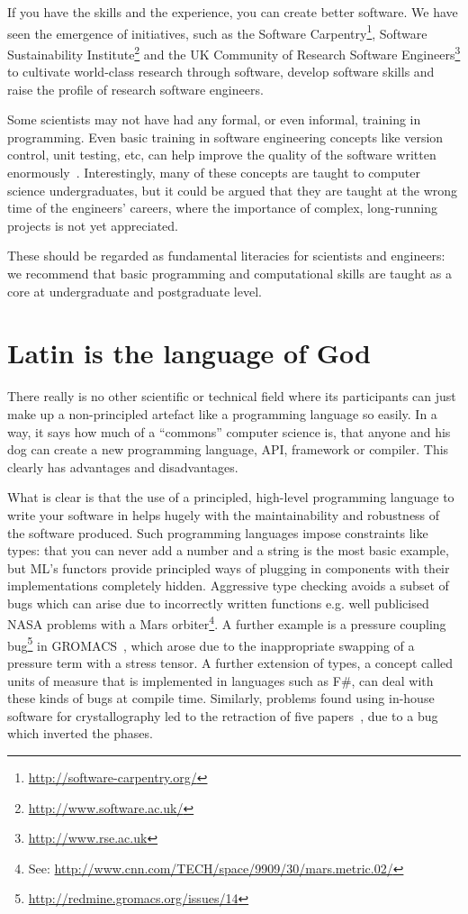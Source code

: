 \documentclass[10pt,conference,final]{IEEEtran}
\begin{document}
If you have the skills and the experience, you can create better
software. We have seen the emergence of initiatives, such as the Software
Carpentry\footnote{\url{http://software-carpentry.org/}}, Software
Sustainability Institute\footnote{\url{http://www.software.ac.uk/}}
and the UK Community of Research Software
Engineers\footnote{\url{http://www.rse.ac.uk}} to cultivate
world-class research through software, develop software skills and
raise the profile of research software engineers.

Some scientists may not have had any formal, or even informal,
training in programming. Even basic training in software engineering
concepts like version control, unit testing, etc, can help improve the
quality of the software written enormously~\cite{wilson2006}.
Interestingly, many of these concepts are taught to computer science
undergraduates, but it could be argued that they are taught at the
wrong time of the engineers' careers, where the importance of complex,
long-running projects is not yet appreciated.

These should be regarded as fundamental literacies for scientists and
engineers: we recommend that basic programming and computational
skills are taught as a core at undergraduate and postgraduate level.


\section{Latin is the language of God} 

There really is no other scientific or technical field where its
participants can just make up a non-principled artefact like a
programming language so easily. In a way, it says how much of a
``commons'' computer science is, that anyone and his dog can create a
new programming language, API, framework or compiler. This clearly has
advantages and disadvantages.

What is clear is that the use of a principled, high-level programming
language to write your software in helps hugely with the
maintainability and robustness of the software produced. Such
programming languages impose constraints like types: that you can
never add a number and a string is the most basic example, but ML's
functors provide principled ways of plugging in components with their
implementations completely hidden. Aggressive type checking avoids a
subset of bugs which can arise due to incorrectly written functions
e.g. well publicised NASA problems with a Mars orbiter\footnote{See:
\url{http://www.cnn.com/TECH/space/9909/30/mars.metric.02/}}.  A
further example is a pressure coupling
bug\footnote{\url{http://redmine.gromacs.org/issues/14}} in
GROMACS~\cite{Hess2008}, which arose due to the inappropriate swapping
of a pressure term with a stress tensor.  A further extension of
types, a concept called units of measure that is implemented in
languages such as F\#, can deal with these kinds of bugs at compile
time. Similarly, problems found using in-house software for
crystallography led to the retraction of five papers~\cite{Miller2006}, due
to a bug which inverted the phases.
\end{document}
